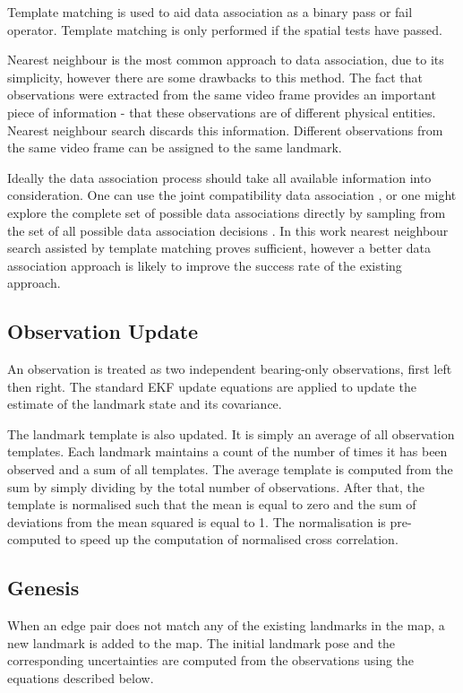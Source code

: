 Template matching is used to aid data association as a binary pass or
fail operator. Template matching is only performed if the spatial
tests have passed.

Nearest neighbour is the most common approach to data association, due
to its simplicity, however there are some drawbacks to this
method. The fact that observations were extracted from the same video
frame provides an important piece of information - that these
observations are of different physical entities. Nearest neighbour
search discards this information. Different observations from the same
video frame can be assigned to the same landmark.

Ideally the data association process should take all available
information into consideration. One can use the joint compatibility
data association \cite{neira01:_data_assoc_stoch_mappin_using}, or one
might explore the complete set of possible data associations directly
by sampling from the set of all possible data association decisions
\cite{nieto2003}. In this work nearest neighbour search assisted by
template matching proves sufficient, however a better data association
approach is likely to improve the success rate of the existing
approach.


\subsection{Observation Update}

An observation is treated as two independent bearing-only
observations, first left then right. The standard EKF update equations
are applied to update the estimate of the landmark state and its
covariance.

The landmark template is also updated. It is simply an average of all
observation templates. Each landmark maintains a count of the number
of times it has been observed and a sum of all templates. The average
template is computed from the sum by simply dividing by the total
number of observations. After that, the template is normalised such
that the mean is equal to zero and the sum of deviations from the
mean squared is equal to 1. The normalisation is pre-computed to speed up
the computation of normalised cross correlation.


\subsection{Genesis}

When an edge pair does not match any of the existing landmarks in
the map, a new landmark is added to the map. The initial landmark pose
and the corresponding uncertainties are computed from the observations
using the equations described below.

